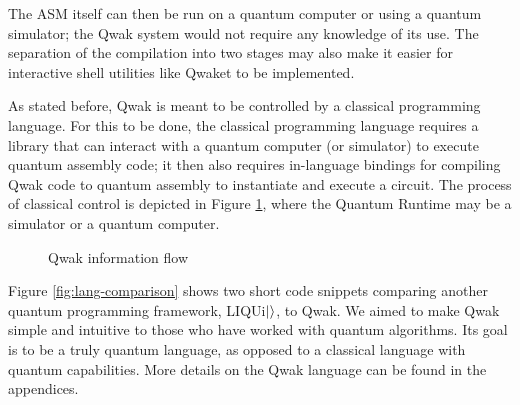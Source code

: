 \documentclass{article}
\begin{document}
The ASM itself can then be run on a quantum computer or using a quantum simulator; the Qwak system would not require any knowledge of its use. The separation of the compilation into two stages may also make it easier for interactive shell utilities like Qwaket to be implemented.

As stated before, Qwak is meant to be controlled by a classical programming language. For this to be done, the classical programming language requires a library that can interact with a quantum computer (or simulator) to execute quantum assembly code; it then also requires in-language bindings for compiling Qwak code to quantum assembly to instantiate and execute a circuit. The process of classical control is depicted in Figure \ref{fig:info-flow}, where the Quantum Runtime may be a simulator or a quantum computer.

\begin{figure}[h]
\centering
{}
\caption{Qwak information flow} \label{fig:info-flow}
\end{figure}

Figure \ref{fig:lang-comparison} shows two short code snippets comparing another quantum programming framework, LIQUi$\ket{}$, to Qwak. We aimed to make Qwak simple and intuitive to those who have worked with quantum algorithms. Its goal is to be a truly quantum language, as opposed to a classical language with quantum capabilities. More details on the Qwak language can be found in the appendices.
\end{document}
